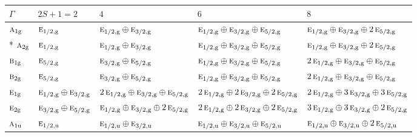 \documentclass[10pt,a4paper]{article}
\numberwithin{equation}{section}
\newcommand{\irr}[1]{\text{\normalfont\scshape #1}}
\newcommand{\ptag}[1]{\mathrm{#1}}
\begin{document}
{\small\setlength{\tabcolsep}{3pt}\begin{longtable}{@{}l>{\RaggedRight\arraybackslash}p{}>{\RaggedRight\arraybackslash}p{}>{\RaggedRight\arraybackslash}p{}>{\RaggedRight\arraybackslash}p{}@{}}\toprule
$\Gamma$ & $2S + 1 = 2$ & $4$ & $6$ & $8$\\\midrule\endhead
\bottomrule\endfoot\endlastfoot
$\irr{a}_{1\ptag{g}}$ & $\irr{e}_{1/2,\ptag{g}}$ & $\irr{e}_{1/2,\ptag{g}}\oplus \irr{e}_{3/2,\ptag{g}}$ & $\irr{e}_{1/2,\ptag{g}}\oplus \irr{e}_{3/2,\ptag{g}}\oplus \irr{e}_{5/2,\ptag{g}}$ & $\irr{e}_{1/2,\ptag{g}}\oplus \irr{e}_{3/2,\ptag{g}}\oplus 2\,\irr{e}_{5/2,\ptag{g}}$\\*
$\irr{a}_{2\ptag{g}}$ & $\irr{e}_{1/2,\ptag{g}}$ & $\irr{e}_{1/2,\ptag{g}}\oplus \irr{e}_{3/2,\ptag{g}}$ & $\irr{e}_{1/2,\ptag{g}}\oplus \irr{e}_{3/2,\ptag{g}}\oplus \irr{e}_{5/2,\ptag{g}}$ & $\irr{e}_{1/2,\ptag{g}}\oplus \irr{e}_{3/2,\ptag{g}}\oplus 2\,\irr{e}_{5/2,\ptag{g}}$\\
$\irr{b}_{1\ptag{g}}$ & $\irr{e}_{5/2,\ptag{g}}$ & $\irr{e}_{3/2,\ptag{g}}\oplus \irr{e}_{5/2,\ptag{g}}$ & $\irr{e}_{1/2,\ptag{g}}\oplus \irr{e}_{3/2,\ptag{g}}\oplus \irr{e}_{5/2,\ptag{g}}$ & $2\,\irr{e}_{1/2,\ptag{g}}\oplus \irr{e}_{3/2,\ptag{g}}\oplus \irr{e}_{5/2,\ptag{g}}$\\
$\irr{b}_{2\ptag{g}}$ & $\irr{e}_{5/2,\ptag{g}}$ & $\irr{e}_{3/2,\ptag{g}}\oplus \irr{e}_{5/2,\ptag{g}}$ & $\irr{e}_{1/2,\ptag{g}}\oplus \irr{e}_{3/2,\ptag{g}}\oplus \irr{e}_{5/2,\ptag{g}}$ & $2\,\irr{e}_{1/2,\ptag{g}}\oplus \irr{e}_{3/2,\ptag{g}}\oplus \irr{e}_{5/2,\ptag{g}}$\\
$\irr{e}_{1\ptag{g}}$ & $\irr{e}_{1/2,\ptag{g}}\oplus \irr{e}_{3/2,\ptag{g}}$ & $2\,\irr{e}_{1/2,\ptag{g}}\oplus \irr{e}_{3/2,\ptag{g}}\oplus \irr{e}_{5/2,\ptag{g}}$ & $2\,\irr{e}_{1/2,\ptag{g}}\oplus 2\,\irr{e}_{3/2,\ptag{g}}\oplus 2\,\irr{e}_{5/2,\ptag{g}}$ & $2\,\irr{e}_{1/2,\ptag{g}}\oplus 3\,\irr{e}_{3/2,\ptag{g}}\oplus 3\,\irr{e}_{5/2,\ptag{g}}$\\
$\irr{e}_{2\ptag{g}}$ & $\irr{e}_{3/2,\ptag{g}}\oplus \irr{e}_{5/2,\ptag{g}}$ & $\irr{e}_{1/2,\ptag{g}}\oplus \irr{e}_{3/2,\ptag{g}}\oplus 2\,\irr{e}_{5/2,\ptag{g}}$ & $2\,\irr{e}_{1/2,\ptag{g}}\oplus 2\,\irr{e}_{3/2,\ptag{g}}\oplus 2\,\irr{e}_{5/2,\ptag{g}}$ & $3\,\irr{e}_{1/2,\ptag{g}}\oplus 3\,\irr{e}_{3/2,\ptag{g}}\oplus 2\,\irr{e}_{5/2,\ptag{g}}$\\
$\irr{a}_{1\ptag{u}}$ & $\irr{e}_{1/2,\ptag{u}}$ & $\irr{e}_{1/2,\ptag{u}}\oplus \irr{e}_{3/2,\ptag{u}}$ & $\irr{e}_{1/2,\ptag{u}}\oplus \irr{e}_{3/2,\ptag{u}}\oplus \irr{e}_{5/2,\ptag{u}}$ & $\irr{e}_{1/2,\ptag{u}}\oplus \irr{e}_{3/2,\ptag{u}}\oplus 2\,\irr{e}_{5/2,\ptag{u}}$\\

\end{longtable}}
\end{document}
